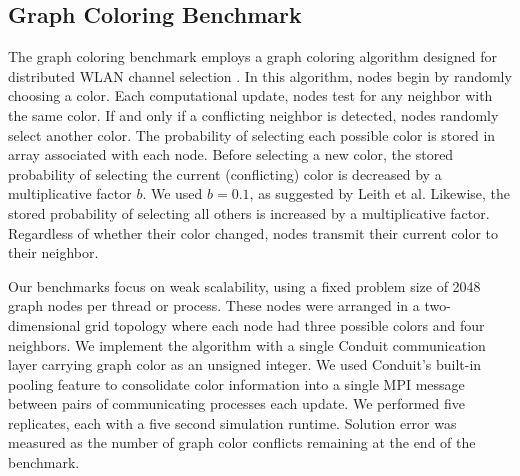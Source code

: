 \subsection{ Graph Coloring Benchmark } \label{sec:graph_coloring_benchmark}

The graph coloring benchmark employs a graph coloring algorithm designed for distributed WLAN channel selection \citep{leith2012wlan}.
In this algorithm, nodes begin by randomly choosing a color.
Each computational update, nodes test for any neighbor with the same color.
If and only if a conflicting neighbor is detected, nodes randomly select another color.
The probability of selecting each possible color is stored in array associated with each node.
Before selecting a new color, the stored probability of selecting the current (conflicting) color is decreased by a multiplicative factor $b$.
We used $b=0.1$, as suggested by Leith et al.
Likewise, the stored probability of selecting all others is increased by a multiplicative factor.
Regardless of whether their color changed, nodes transmit their current color to their neighbor.

Our benchmarks focus on weak scalability, using a fixed problem size of 2048 graph nodes per thread or process.
These nodes were arranged in a two-dimensional grid topology where each node had three possible colors and four neighbors.
We implement the algorithm with a single Conduit communication layer carrying graph color as an unsigned integer.
We used Conduit's built-in pooling feature to consolidate color information into a single MPI message between pairs of communicating processes each update.
We performed five replicates, each with a five second simulation runtime.
Solution error was measured as the number of graph color conflicts remaining at the end of the benchmark.
